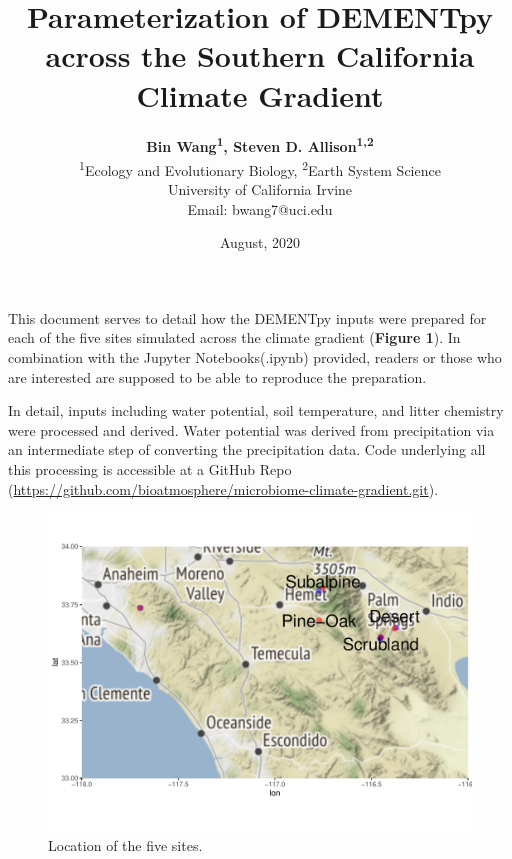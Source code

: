 \documentclass[letterpaper, 10pt]{article}
\begin{document}
\setlength{\droptitle}{-10em} 
\title{\large\textbf{Parameterization of DEMENTpy across the Southern California Climate Gradient}\vspace{0em}}
\author{\normalsize\textbf{Bin Wang\textsuperscript{1}, Steven D. Allison\textsuperscript{1,2}}\vspace{1em} \\
\textsuperscript{1}Ecology and Evolutionary Biology, \textsuperscript{2}Earth System Science \\
University of California Irvine\vspace{-0em} \\
Email: bwang7@uci.edu} 
\date{\normalsize August, 2020\vspace{0em}}
\maketitle


This document serves to detail how the DEMENTpy inputs were prepared for each of the five sites simulated across the climate gradient (\textbf{Figure 1}). In combination with the Jupyter Notebooks(.ipynb) provided, readers or those who are interested are supposed to be able to reproduce the preparation.

In detail, inputs including water potential, soil temperature, and litter chemistry were processed and derived. Water potential was derived from precipitation via an intermediate step of converting the precipitation data. Code underlying all this processing is accessible at a GitHub Repo (\url{https://github.com/bioatmosphere/microbiome-climate-gradient.git}).

\begin{figure}[h]
\centering
      \includegraphics[scale=0.5]{site_location_v1.pdf}
      \caption{Location of the five sites.}
      \label{fig: figure 1}
\end{figure}
\end{document}
